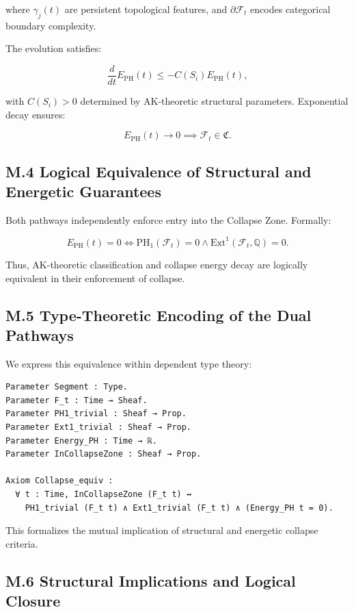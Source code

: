 \documentclass[11pt]{article}
\begin{document}
where $\gamma_j(t)$ are persistent topological features, and $\partial \mathcal{F}_t$ encodes categorical boundary complexity.

The evolution satisfies:

\[
\frac{d}{dt} E_{\mathrm{PH}}(t) \leq -C(S_i) E_{\mathrm{PH}}(t),
\]

with $C(S_i) > 0$ determined by AK-theoretic structural parameters. Exponential decay ensures:

\[
E_{\mathrm{PH}}(t) \to 0 \implies \mathcal{F}_t \in \mathfrak{C}.
\]

\subsection*{M.4 Logical Equivalence of Structural and Energetic Guarantees}

Both pathways independently enforce entry into the Collapse Zone. Formally:

\[
E_{\mathrm{PH}}(t) = 0 \iff \mathrm{PH}_1(\mathcal{F}_t) = 0 \land \mathrm{Ext}^1(\mathcal{F}_t, \mathbb{Q}) = 0.
\]

Thus, AK-theoretic classification and collapse energy decay are logically equivalent in their enforcement of collapse.

\subsection*{M.5 Type-Theoretic Encoding of the Dual Pathways}

We express this equivalence within dependent type theory:

\begin{lstlisting}[language=Coq]
Parameter Segment : Type.
Parameter F_t : Time → Sheaf.
Parameter PH1_trivial : Sheaf → Prop.
Parameter Ext1_trivial : Sheaf → Prop.
Parameter Energy_PH : Time → ℝ.
Parameter InCollapseZone : Sheaf → Prop.

Axiom Collapse_equiv :
  ∀ t : Time, InCollapseZone (F_t t) ↔
    PH1_trivial (F_t t) ∧ Ext1_trivial (F_t t) ∧ (Energy_PH t = 0).
\end{lstlisting}

This formalizes the mutual implication of structural and energetic collapse criteria.

\subsection*{M.6 Structural Implications and Logical Closure}
\end{document}
